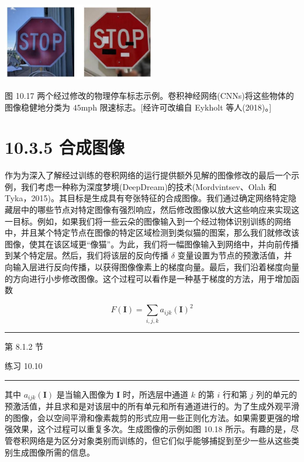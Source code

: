 \documentclass[10pt]{report}
\newcommand{\HRule}{\begin{center}\rule{0.9\linewidth}{0.2mm}\end{center}}
\begin{document}
\begin{center}
\includegraphics[max width=0.5\textwidth]{images/0194e279-9b28-703a-88f4-c3ac21e2010d_326_868_1593_655_331_0.jpg}
\end{center}
\hspace*{3em} 

图 10.17 两个经过修改的物理停车标志示例。卷积神经网络(CNNs)将这些物体的图像稳健地分类为 \({45}\mathrm{{mph}}\) 限速标志。[经许可改编自 Eykholt 等人(2018)。]

\section*{10.3.5 合成图像}

作为为深入了解经过训练的卷积网络的运行提供额外见解的图像修改的最后一个示例，我们考虑一种称为深度梦境(DeepDream)的技术(Mordvintsev、Olah 和 Tyka，2015)。其目标是生成具有夸张特征的合成图像。我们通过确定网络特定隐藏层中的哪些节点对特定图像有强烈响应，然后修改图像以放大这些响应来实现这一目标。例如，如果我们将一些云朵的图像输入到一个经过物体识别训练的网络中，并且某个特定节点在图像的特定区域检测到类似猫的图案，那么我们就修改该图像，使其在该区域更“像猫”。为此，我们将一幅图像输入到网络中，并向前传播到某个特定层。然后，我们将该层的反向传播 \(\delta\) 变量设置为节点的预激活值，并向输入层进行反向传播，以获得图像像素上的梯度向量。最后，我们沿着梯度向量的方向进行小步修改图像。这个过程可以看作是一种基于梯度的方法，用于增加函数

\[
F\left( \mathbf{I}\right)  = \mathop{\sum }\limits_{{i,j,k}}{a}_{ijk}{\left( \mathbf{I}\right) }^{2} \tag{10.12}
\]

\HRule

第 8.1.2 节

练习 10.10

\HRule

其中 \({a}_{ijk}\left( \mathbf{I}\right)\) 是当输入图像为 \(\mathbf{I}\) 时，所选层中通道 \(k\) 的第 \(i\) 行和第 \(j\) 列的单元的预激活值，并且求和是对该层中的所有单元和所有通道进行的。为了生成外观平滑的图像，会以空间平滑和像素裁剪的形式应用一些正则化方法。如果需要更强的增强效果，这个过程可以重复多次。生成图像的示例如图 10.18 所示。有趣的是，尽管卷积网络是为区分对象类别而训练的，但它们似乎能够捕捉到至少一些从这些类别生成图像所需的信息。
\end{document}
